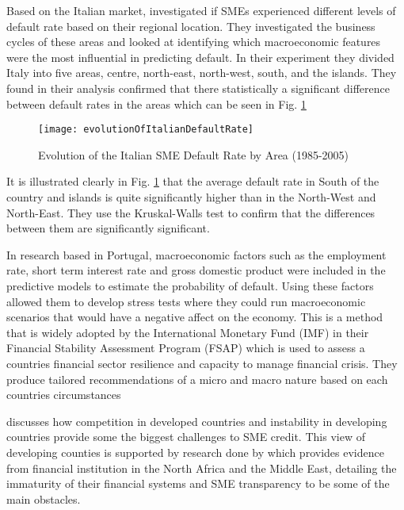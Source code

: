 Based on the Italian market, \citep{di_pietro_regional} investigated if SMEs experienced different levels of default rate based on their regional location. They investigated the business cycles of these areas and looked at identifying which macroeconomic features were the most influential in predicting default. In their experiment they divided Italy into five areas, centre, north-east, north-west, south, and the islands. They found in their analysis confirmed that there statistically a significant difference between default rates in the areas which can be seen in Fig. \ref{fig:evolutionOfItalianDefaultRate}

\begin{figure}[H]
	\texttt{[image: evolutionOfItalianDefaultRate]}
	\caption{Evolution of the Italian SME Default Rate by Area (1985-2005) \\
	\cite[Source:][]{di_pietro_regional}		
			}
	\label{fig:evolutionOfItalianDefaultRate}
\end{figure}

It is  illustrated clearly in Fig. \ref{fig:evolutionOfItalianDefaultRate} that the average default rate in South of the country and islands is quite significantly higher than in the North-West and North-East. They use the Kruskal-Walls test to confirm that the differences between them are significantly significant.

In \cite{antunes_estimating_2005} research based in Portugal, macroeconomic factors such as the employment rate, short term interest rate and gross domestic product were included in the predictive models to estimate the probability of default. Using these factors allowed them to develop stress tests where they could run macroeconomic scenarios that would have a negative affect on the economy. This is a method that is widely adopted by the International Monetary Fund (IMF) in their Financial Stability Assessment Program (FSAP) which is used to assess a countries financial sector resilience and capacity to manage financial crisis. They produce tailored recommendations of a micro and macro nature based on each countries circumstances \citep{marston_financial_2001} 

\cite{ardic_small_2011} discusses how competition in developed countries and instability in developing countries provide some the biggest challenges to SME credit. This view of developing counties is supported by research done by \cite{rocha_status_2011} which provides evidence from financial institution in the North Africa and the Middle East, detailing the immaturity of their financial systems and SME transparency to be some of the main obstacles. 

